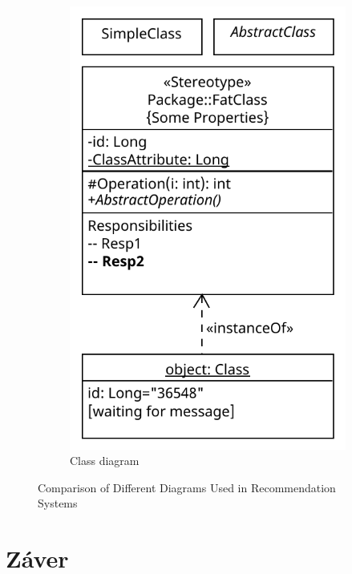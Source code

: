 \documentclass[10pt,twocolumn,twoside,slovak,a4paper]{article}
\begin{document}
\begin{figure}[htbp]
\begin{subfigure}[b]{0.45\textwidth}
        \includegraphics[width=\textwidth]{Diagrams/Diagram 2024-10-24 01-38-35.pdf}
        \caption{Class diagram}
        \label{fig:content_based_filtering}
    \end{subfigure}
    \caption{Comparison of Different Diagrams Used in Recommendation Systems}
    \label{fig:recommendation_systems}
\end{figure}


\section{Záver} \label{zaver} %







\end{document}
